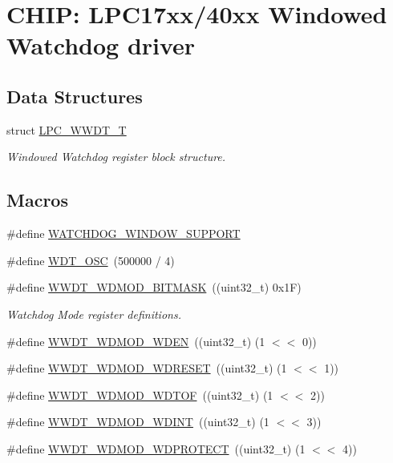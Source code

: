 \hypertarget{group__WWDT__17XX__40XX}{\section{C\-H\-I\-P\-: L\-P\-C17xx/40xx Windowed Watchdog driver}
\label{group__WWDT__17XX__40XX}
}
\subsection*{Data Structures}
\begin{DoxyCompactItemize}
\item 
struct \hyperlink{structLPC__WWDT__T}{L\-P\-C\-\_\-\-W\-W\-D\-T\-\_\-\-T}
\begin{DoxyCompactList}\small\item\em Windowed Watchdog register block structure. \end{DoxyCompactList}\end{DoxyCompactItemize}
\subsection*{Macros}
\begin{DoxyCompactItemize}
\item 
\#define \hyperlink{group__WWDT__17XX__40XX_gafd5360b2cfcfe4271a608b6c90bcea5f}{W\-A\-T\-C\-H\-D\-O\-G\-\_\-\-W\-I\-N\-D\-O\-W\-\_\-\-S\-U\-P\-P\-O\-R\-T}
\item 
\#define \hyperlink{group__WWDT__17XX__40XX_ga628282c7bf5c28d5a859e4915c62b643}{W\-D\-T\-\_\-\-O\-S\-C}~(500000 / 4)
\item 
\#define \hyperlink{group__WWDT__17XX__40XX_gac9ba0cf06012012875985842cabb5a11}{W\-W\-D\-T\-\_\-\-W\-D\-M\-O\-D\-\_\-\-B\-I\-T\-M\-A\-S\-K}~((uint32\-\_\-t) 0x1\-F)
\begin{DoxyCompactList}\small\item\em Watchdog Mode register definitions. \end{DoxyCompactList}\item 
\#define \hyperlink{group__WWDT__17XX__40XX_ga9c4d839b554cf8919c76bd613745967f}{W\-W\-D\-T\-\_\-\-W\-D\-M\-O\-D\-\_\-\-W\-D\-E\-N}~((uint32\-\_\-t) (1 $<$$<$ 0))
\item 
\#define \hyperlink{group__WWDT__17XX__40XX_gaa6b03ad5df847bc2241c0ea1eefd9431}{W\-W\-D\-T\-\_\-\-W\-D\-M\-O\-D\-\_\-\-W\-D\-R\-E\-S\-E\-T}~((uint32\-\_\-t) (1 $<$$<$ 1))
\item 
\#define \hyperlink{group__WWDT__17XX__40XX_ga9379872b1e184e20abf74f1abbdd8cb9}{W\-W\-D\-T\-\_\-\-W\-D\-M\-O\-D\-\_\-\-W\-D\-T\-O\-F}~((uint32\-\_\-t) (1 $<$$<$ 2))
\item 
\#define \hyperlink{group__WWDT__17XX__40XX_ga6530623c6535d2c7b65c9b50d320c5f1}{W\-W\-D\-T\-\_\-\-W\-D\-M\-O\-D\-\_\-\-W\-D\-I\-N\-T}~((uint32\-\_\-t) (1 $<$$<$ 3))
\item 
\#define \hyperlink{group__WWDT__17XX__40XX_gac44132c9f40915e405e3cfedc2599586}{W\-W\-D\-T\-\_\-\-W\-D\-M\-O\-D\-\_\-\-W\-D\-P\-R\-O\-T\-E\-C\-T}~((uint32\-\_\-t) (1 $<$$<$ 4))
\end{DoxyCompactItemize}
